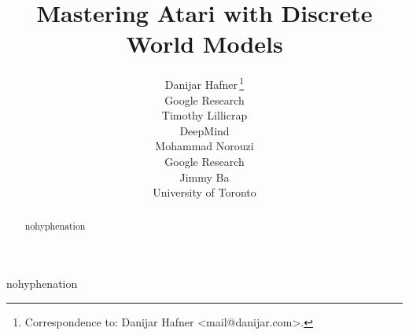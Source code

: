 \documentclass{article}
\title{Mastering Atari with Discrete World Models}
\author{%
Danijar Hafner\,\thanks{Correspondence to: Danijar Hafner <mail@danijar.com>.} \\
Google Research \\
\And
Timothy Lillicrap \\
DeepMind \\
\And
Mohammad Norouzi \\
Google Research \\
\And
Jimmy Ba \\
University of Toronto \\
}
\begin{document}
\maketitle

\begin{abstract}
\begin{hyphenrules}{nohyphenation}

\end{hyphenrules}
\end{abstract}







\clearpage
\begin{hyphenrules}{nohyphenation}

\end{hyphenrules}
\clearpage
\appendix
{}




\end{document}
